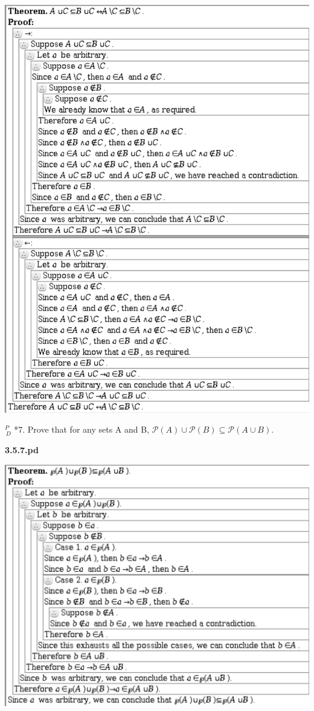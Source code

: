\documentclass{article}
\begin{document}
\includegraphics[scale=0.15]{3_5_6}

\vspace{30pt}

$^{\textit{P}}_{\, \textit{D}}$ *7. Prove that for any sets A and B, $\mathcal{P} (A) \cup \mathcal{P} (B) \subseteq \mathcal{P} (A \cup B)$.

\vspace{30pt}

\textbf{3.5.7.pd}
\vspace{10pt}

\includegraphics[width=\textwidth]{3_5_7}
\end{document}
